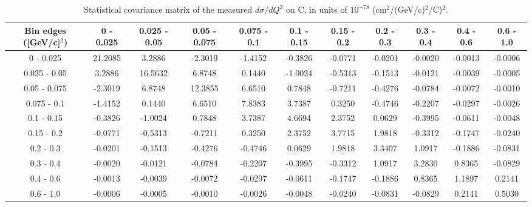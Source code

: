 \documentclass[aps,prl,twocolumn,superscriptaddress,nofootinbib]{revtex4-1}
\begin{document}
\begin{table}[h!]
  \centering
  \caption{Statistical covariance matrix of the measured $d\sigma/dQ^{2}$ on C, in units of $10^{-78}$ (cm$^{2}$/(GeV/c)$^{2}$/C)$^{2}$.}
    \begin{tabular}{c||cccccccccc}
      Bin edges ([GeV/c]$^{2}$) & 0 - 0.025 & 0.025 - 0.05 & 0.05 - 0.075 & 0.075 - 0.1 & 0.1 - 0.15 & 0.15 - 0.2 & 0.2 - 0.3 & 0.3 - 0.4 & 0.4 - 0.6 & 0.6 - 1.0 \\
\hline \hline
         0 - 0.025 & 21.2085 &  3.2886 & -2.3019 & -1.4152 & -0.3826 & -0.0771 & -0.0201 & -0.0020 & -0.0013 & -0.0006 \\
      0.025 - 0.05 &  3.2886 & 16.5632 &  6.8748 &  0.1440 & -1.0024 & -0.5313 & -0.1513 & -0.0121 & -0.0039 & -0.0005 \\
      0.05 - 0.075 & -2.3019 &  6.8748 & 12.3855 &  6.6510 &  0.7848 & -0.7211 & -0.4276 & -0.0784 & -0.0072 & -0.0010 \\
       0.075 - 0.1 & -1.4152 &  0.1440 &  6.6510 &  7.8383 &  3.7387 &  0.3250 & -0.4746 & -0.2207 & -0.0297 & -0.0026 \\
        0.1 - 0.15 & -0.3826 & -1.0024 &  0.7848 &  3.7387 &  4.6694 &  2.3752 &  0.0629 & -0.3995 & -0.0611 & -0.0048 \\
        0.15 - 0.2 & -0.0771 & -0.5313 & -0.7211 &  0.3250 &  2.3752 &  3.7715 &  1.9818 & -0.3312 & -0.1747 & -0.0240 \\
         0.2 - 0.3 & -0.0201 & -0.1513 & -0.4276 & -0.4746 &  0.0629 &  1.9818 &  3.3407 &  1.0917 & -0.1886 & -0.0831 \\
         0.3 - 0.4 & -0.0020 & -0.0121 & -0.0784 & -0.2207 & -0.3995 & -0.3312 &  1.0917 &  3.2830 &  0.8365 & -0.0829 \\
         0.4 - 0.6 & -0.0013 & -0.0039 & -0.0072 & -0.0297 & -0.0611 & -0.1747 & -0.1886 &  0.8365 &  1.1897 &  0.2141 \\
         0.6 - 1.0 & -0.0006 & -0.0005 & -0.0010 & -0.0026 & -0.0048 & -0.0240 & -0.0831 & -0.0829 &  0.2141 &  0.5030 \\
    \end{tabular}
  \label{tablecov:C_Statistical_Q2}
\end{table}
\end{document}
